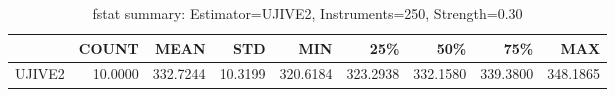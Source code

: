 \begin{table}[ht]
\centering
\caption{fstat summary: Estimator=UJIVE2, Instruments=250, Strength=0.30}
\begin{tabular}{lrrrrrrrr}
\toprule
 & COUNT & MEAN & STD & MIN & 25\% & 50\% & 75\% & MAX \\
\midrule
UJIVE2 & 10.0000 & 332.7244 & 10.3199 & 320.6184 & 323.2938 & 332.1580 & 339.3800 & 348.1865 \\
\bottomrule
\end{tabular}
\end{table}
